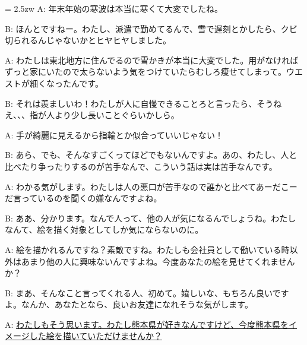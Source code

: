 \documentclass[11pt]{amsart}
\title{}
\author{}
\newenvironment{hangall}[1]{\hangindent = 2.5zw\everypar{\hangindent = 2.5zw}}{}
\begin{document}
\maketitle
\begin{hangall}{}%
A: 年末年始の寒波は本当に寒くて大変でしたね。

B: ほんとですねー。わたし、派遣で勤めてるんで、雪で遅刻とかしたら、クビ切られるんじゃないかとヒヤヒヤしました。

A: わたしは東北地方に住んでるので雪かきが本当に大変でした。用がなければずっと家にいたので太らないよう気をつけていたらむしろ痩せてしまって。ウエストが細くなったんです。

B: それは羨ましいわ！わたしが人に自慢できることろと言ったら、そうねえ、、、指が人より少し長いことぐらいかしら。

A: 手が綺麗に見えるから指輪とか似合っていいじゃない！

B: あら、でも、そんなすごくってほどでもないんですよ。あの、わたし、人と比べたり争ったりするのが苦手なんで、こういう話は実は苦手なんです。

A: わかる気がします。わたしは人の悪口が苦手なので誰かと比べてあーだこーだ言っているのを聞くの嫌なんですよね。

B: ああ、分かります。なんで人って、他の人が気になるんでしょうね。わたしなんて、絵を描く対象としてしか気にならないのに。

A: 絵を描かれるんですね？素敵ですね。わたしも会社員として働いている時以外はあまり他の人に興味ないんですよね。今度あなたの絵を見せてくれませんか？

B: まあ、そんなこと言ってくれる人、初めて。嬉しいな、もちろん良いですよ。なんか、あなたとなら、良いお友達になれそうな気がします。

A: \ul{わたしもそう思います。わたし熊本県が好きなんですけど、今度熊本県をイメージした絵を描いていただけませんか？}\end{hangall}
\end{document}
